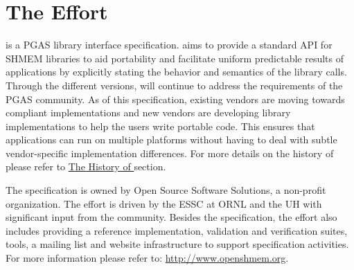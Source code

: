 \section{The \openshmem Effort}

\openshmem is a \ac{PGAS} library interface specification. \openshmem aims to provide a standard \ac{API} for SHMEM libraries to aid portability and facilitate uniform predictable results of \openshmem applications by explicitly stating the behavior and semantics of the \openshmem library calls. Through the different versions, \openshmem will continue to address the requirements of the \ac{PGAS} community. 
As of this specification, existing vendors are moving towards \openshmem compliant implementations and new vendors are developing \openshmem library implementations to help the users write portable \openshmem code. This ensures that applications can run on multiple platforms without having to deal with subtle vendor-specific implementation differences. For more details on the history of 
\openshmem please refer to \hyperref[sec:openshmem_history]{The History of \openshmem} section.  

The \openshmem specification is owned by Open Source Software Solutions, a non-profit organization. 
The \openshmem effort is driven by the \ac{ESSC} at \ac{ORNL} and the \ac{UH} 
with significant input from the \openshmem{} community. Besides the
specification, the effort also includes providing a reference \openshmem implementation,
validation and verification suites, tools, a mailing list and website infrastructure to support
specification activities. For more information please refer to: \url{http://www.openshmem.org}.

